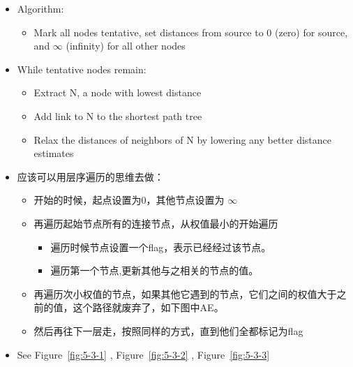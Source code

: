 \documentclass[12pt]{ctexart}   %
\begin{document}
	\begin{itemize}
		\item Algorithm:
		\begin{itemize}
			\item Mark all nodes tentative, set distances from source to 0 (zero) for source, and $\infty$ (infinity) for all other nodes
		\end{itemize}
		
		\item While tentative nodes remain:
		\begin{itemize}
			\item Extract N, a node with lowest distance
			\item Add link to N to the shortest path tree
			\item Relax the distances of neighbors of N by lowering any better distance estimates
		\end{itemize}
		
		\item 应该可以用层序遍历的思维去做：
		\begin{itemize}
			\item 开始的时候，起点设置为0，其他节点设置为 $\infty$ 
			\item 再遍历起始节点所有的连接节点，从权值最小的开始遍历
			\begin{itemize}
				\item 遍历时候节点设置一个flag，表示已经经过该节点。
				\item 遍历第一个节点,更新其他与之相关的节点的值。
			\end{itemize}
			\item 再遍历次小权值的节点，如果其他它遇到的节点，它们之间的权值大于之前的值，这个路径就废弃了，如下图中AE。
			\item 然后再往下一层走，按照同样的方式，直到他们全都标记为flag
		\end{itemize}
		
		\item See Figure~\ref{fig:5-3-1}  ,  Figure~\ref{fig:5-3-2} ,  Figure~\ref{fig:5-3-3}
		

\end{itemize}
\end{document}
